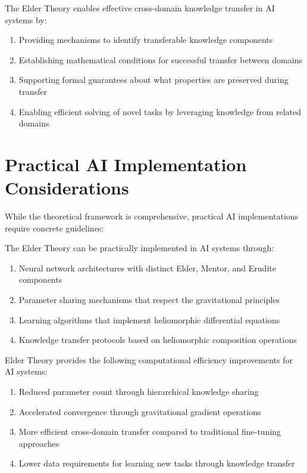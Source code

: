 \begin{theorem}
\label{thm:cross_domain_transfer_ai}
The Elder Theory enables effective cross-domain knowledge transfer in AI systems by:
\begin{enumerate}
    \item Providing mechanisms to identify transferable knowledge components
    \item Establishing mathematical conditions for successful transfer between domains
    \item Supporting formal guarantees about what properties are preserved during transfer
    \item Enabling efficient solving of novel tasks by leveraging knowledge from related domains
\end{enumerate}
\end{theorem}

\section{Practical AI Implementation Considerations}

While the theoretical framework is comprehensive, practical AI implementations require concrete guidelines:

\begin{theorem}
\label{thm:ai_implementation_framework}
The Elder Theory can be practically implemented in AI systems through:
\begin{enumerate}
    \item Neural network architectures with distinct Elder, Mentor, and Erudite components
    \item Parameter sharing mechanisms that respect the gravitational principles
    \item Learning algorithms that implement heliomorphic differential equations
    \item Knowledge transfer protocols based on heliomorphic composition operations
\end{enumerate}
\end{theorem}

\begin{theorem}
\label{thm:computational_efficiency_ai}
Elder Theory provides the following computational efficiency improvements for AI systems:
\begin{enumerate}
    \item Reduced parameter count through hierarchical knowledge sharing
    \item Accelerated convergence through gravitational gradient operations
    \item More efficient cross-domain transfer compared to traditional fine-tuning approaches
    \item Lower data requirements for learning new tasks through knowledge transfer
\end{enumerate}
\end{theorem}

